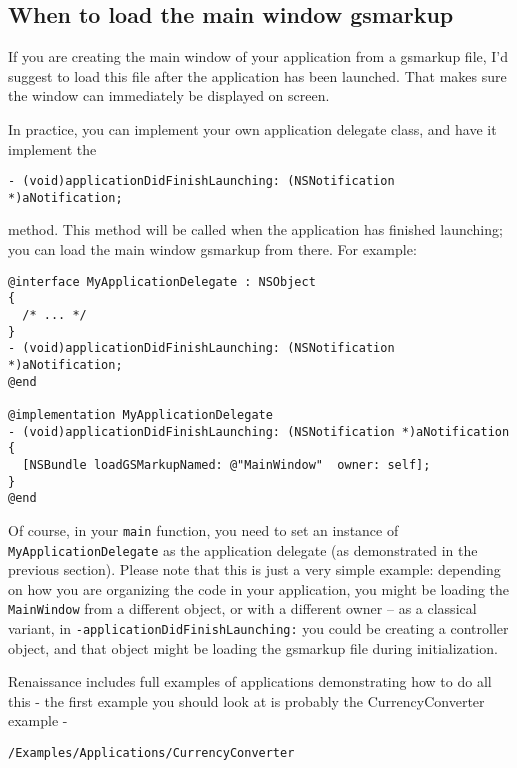 \subsection{When to load the main window gsmarkup}
If you are creating the main window of your application from a
gsmarkup file, I'd suggest to load this file after the application has
been launched.  That makes sure the window can immediately be
displayed on screen.

In practice, you can implement your own application delegate class,
and have it implement the 
\begin{verbatim}
- (void)applicationDidFinishLaunching: (NSNotification *)aNotification;
\end{verbatim}
method.  This method will be called when the application has finished
launching; you can load the main window gsmarkup from there.  For
example:
\begin{verbatim}
@interface MyApplicationDelegate : NSObject
{
  /* ... */
}
- (void)applicationDidFinishLaunching: (NSNotification *)aNotification;
@end

@implementation MyApplicationDelegate
- (void)applicationDidFinishLaunching: (NSNotification *)aNotification
{
  [NSBundle loadGSMarkupNamed: @"MainWindow"  owner: self];  
}
@end
\end{verbatim}
Of course, in your \texttt{main} function, you need to set an instance
of \texttt{MyApplicationDelegate} as the application delegate (as
demonstrated in the previous section).  Please note that this is just
a very simple example: depending on how you are organizing the code in
your application, you might be loading the \texttt{MainWindow} from a
different object, or with a different owner -- as a classical variant,
in \texttt{-applicationDidFinishLaunching:} you could be creating a
controller object, and that object might be loading the gsmarkup file
during initialization.

Renaissance includes full examples of applications demonstrating how
to do all this - the first example you should look at is probably the
CurrencyConverter example -
\begin{verbatim}
/Examples/Applications/CurrencyConverter
\end{verbatim}

